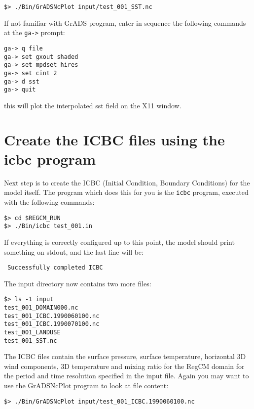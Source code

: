 \begin{Verbatim}
$> ./Bin/GrADSNcPlot input/test_001_SST.nc
\end{Verbatim}

If not familiar with GrADS program, enter in sequence the following commands at
the \verb=ga->= prompt:

\begin{Verbatim}
ga-> q file
ga-> set gxout shaded
ga-> set mpdset hires
ga-> set cint 2
ga-> d sst
ga-> quit
\end{Verbatim}

this will plot the interpolated sst field on the X11 window.

\section{Create the ICBC files using the icbc program}

Next step is to create the ICBC (Initial Condition, Boundary Conditions) for
the model itself. The program which does this for you is the \verb=icbc=
program, executed with the following commands:

\begin{Verbatim}
$> cd $REGCM_RUN
$> ./Bin/icbc test_001.in
\end{Verbatim}

If everything is correctly configured up to this point, the model should print
something on stdout, and the last line will be:

\begin{Verbatim}
 Successfully completed ICBC
\end{Verbatim}

The input directory now contains two more files:

\begin{Verbatim}
$> ls -1 input
test_001_DOMAIN000.nc
test_001_ICBC.1990060100.nc
test_001_ICBC.1990070100.nc
test_001_LANDUSE
test_001_SST.nc
\end{Verbatim}

The ICBC files contain the surface pressure, surface temperature, horizontal
3D wind components, 3D temperature and mixing ratio for the RegCM domain for the
period and time resolution specified in the input file.
Again you may want to use the GrADSNcPlot program to look at file content:

\begin{Verbatim}
$> ./Bin/GrADSNcPlot input/test_001_ICBC.1990060100.nc
\end{Verbatim}

